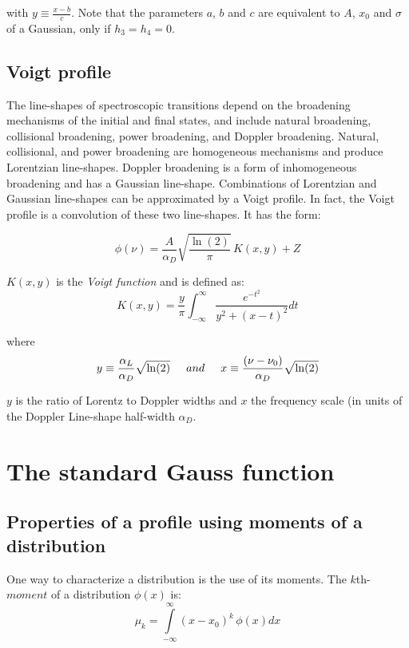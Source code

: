 \documentclass[10pt,a4paper]{report}
\begin{document}
\begin{flushleft}
with $y \equiv \frac{x-b}{c}$. 
Note that the parameters $a$, $b$ and $c$ are equivalent to $A$, $x_0$ and
$\sigma$ of a Gaussian, only if $h_3 = h_4 = 0$.


\section{Voigt profile}

The line-shapes of spectroscopic 
transitions depend on the broadening mechanisms
of the initial and final states, and include natural broadening, 
collisional broadening, power broadening, and
Doppler broadening. Natural, collisional, and power broadening are 
homogeneous mechanisms and produce Lorentzian line-shapes. 
Doppler broadening is a form of inhomogeneous broadening and has a 
Gaussian line-shape. Combinations of
Lorentzian and Gaussian line-shapes can be approximated by a Voigt profile. 
In fact, the Voigt profile is a convolution of these two line-shapes. 
It has the form:

\begin{equation}
\phi(\nu) = \frac{A}{\alpha_D }\sqrt{\frac{\ln(2)}{\pi }} \, K(x,y) + Z
\end{equation}


$K(x,y)$ is the {\it Voigt function} and is defined as:
$$
K(x,y) = \frac{y}{\pi} \int_{-\infty}^{\infty} \frac{e^{-t^{2}}}{y^{2}+(x-t)^{2}} dt 
$$

where 
\begin{equation} 
y \equiv \frac{\alpha_L}{\alpha_D}\sqrt{\ln(2)} \hspace{0.5cm} and \hspace{0.5cm}
x \equiv \frac{(\nu-\nu_0)}{\alpha_D} \sqrt{\ln(2)}
\end{equation}

$y$ is the ratio of Lorentz to Doppler widths and $x$ the frequency 
scale (in units of the Doppler Line-shape half-width  $\alpha_D$.


\chapter{The standard Gauss function}
\section{Properties of a profile using moments of a distribution}

One way to characterize a distribution is the use of its moments.
The $k$th-$moment$ of a distribution $\phi(x)$ is:
$$ \mu_k = \int\limits_{-\infty}^{\infty}{(x-x_0)}^k\,\phi(x) dx $$


\end{flushleft}
\end{document}
